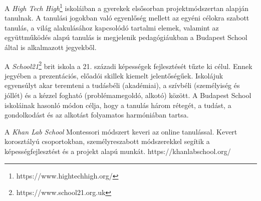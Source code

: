 A \emph{High Tech High}\footnote{https://www.hightechhigh.org/} iskoláiban a
gyerekek elsősorban projektmódszertan
alapján tanulnak. A tanulási jogokban való egyenlőség mellett az egyéni
célokra szabott tanulás, a világ alakulásához kapcsolódó tartalmi
elemek, valamint az együttműködés alapú tanulás is megjelenik
pedagógiáukban a Budapest School által is alkalmazott jegyekből.

A \emph{School21}\footnote{https://www.school21.org.uk} brit iskola a 21.
századi képességek fejlesztését tűzte ki
célul. Ennek jegyében a prezentációs, előadói skillek kiemelt
jelentőségűek. Iskolájuk egyensúlyt akar teremteni a tudásbéli
(akadémiai), a szívbéli (személyiség és jóllét) és a kézzel fogható
(problémamegoldó, alkotó) között. A Budapest School iskoláinak hasonló
módon célja, hogy a tanulás három rétegét, a tudást, a gondolkodást és
az alkotást folyamatos harmóniában tartsa.

A \emph{Khan Lab School} Montessori módszert keveri az online tanulással.
Kevert
korosztályú csoportokban, személyreszabott módszerekkel segítik a
képességfejlesztést és a projekt alapú munkát.
https://khanlabschool.org/
